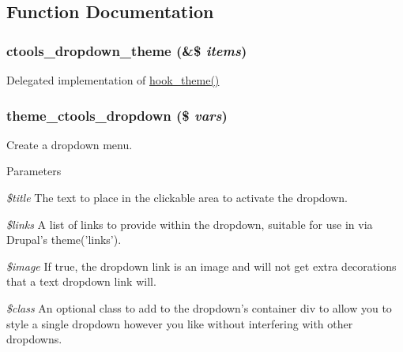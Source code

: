 \subsection{Function Documentation}
\hypertarget{dropdown_8theme_8inc_a896a70c94dd269a16949457d7da86d41}{
\subsubsection[{ctools\_\-dropdown\_\-theme}]{\setlength{\rightskip}{0pt plus 5cm}ctools\_\-dropdown\_\-theme (\&\$ {\em items})}}
\label{dropdown_8theme_8inc_a896a70c94dd269a16949457d7da86d41}
Delegated implementation of \hyperlink{group__hooks_ga013ccb45c7aaab1c16cf9691428c910d}{hook\_\-theme()} \hypertarget{dropdown_8theme_8inc_a8343d27a7f44c9ecd888fc539a900bfd}{
\subsubsection[{theme\_\-ctools\_\-dropdown}]{\setlength{\rightskip}{0pt plus 5cm}theme\_\-ctools\_\-dropdown (\$ {\em vars})}}
\label{dropdown_8theme_8inc_a8343d27a7f44c9ecd888fc539a900bfd}
Create a dropdown menu.


\begin{DoxyParams}{Parameters}
\item[{\em \$title}]The text to place in the clickable area to activate the dropdown. \item[{\em \$links}]A list of links to provide within the dropdown, suitable for use in via Drupal's theme('links'). \item[{\em \$image}]If true, the dropdown link is an image and will not get extra decorations that a text dropdown link will. \item[{\em \$class}]An optional class to add to the dropdown's container div to allow you to style a single dropdown however you like without interfering with other dropdowns. \end{DoxyParams}
